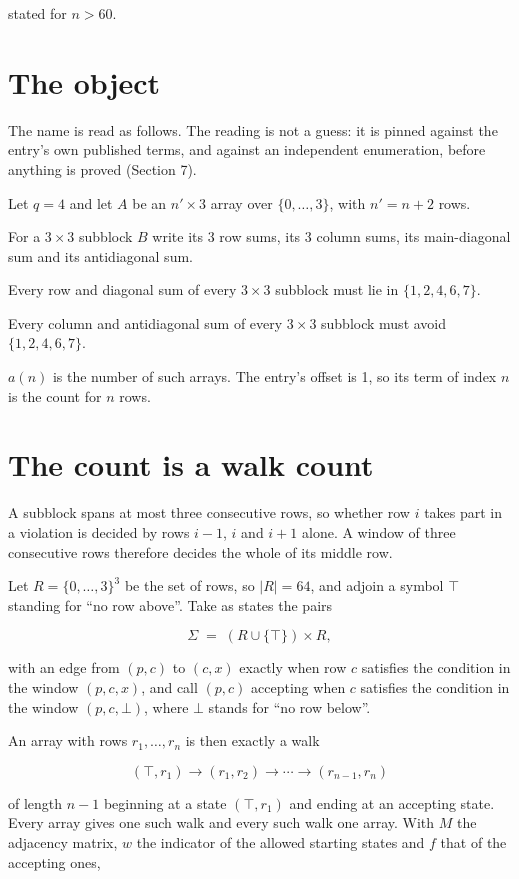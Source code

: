 \documentclass[11pt]{article}
\theoremstyle{definition}
\begin{document}
stated for $n > 60$.

\section{The object}

The name is read as follows. The reading is not a guess: it is pinned against the entry's own published terms, and against an independent enumeration, before anything is proved (Section 7).

Let $q = 4$ and let $A$ be an $n' \times 3$ array over $\{0,\dots,3\}$, with $n' = n + 2$ rows.

For a $3\times3$ subblock $B$ write its 3 row sums, its 3 column sums, its main-diagonal sum and its antidiagonal sum.

Every row and diagonal sum of every $3\times3$ subblock must lie in $\{1, 2, 4, 6, 7\}$.

Every column and antidiagonal sum of every $3\times3$ subblock must avoid $\{1, 2, 4, 6, 7\}$.

$a(n)$ is the number of such arrays. The entry's offset is 1, so its term of index $n$ is the count for $n$ rows.

\section{The count is a walk count}

A subblock spans at most three consecutive rows, so whether row $i$ takes part in a violation is decided by rows $i-1$, $i$ and $i+1$ alone. A window of three consecutive rows therefore decides the whole of its middle row.

Let $R = \{0,\dots,3\}^{3}$ be the set of rows, so $|R| = 64$, and adjoin a symbol $\top$ standing for ``no row above''. Take as states the pairs

\[\Sigma \;=\; (R \cup \{\top\}) \times R,\]

with an edge from $(p,c)$ to $(c,x)$ exactly when row $c$ satisfies the condition in the window $(p,c,x)$, and call $(p,c)$ accepting when $c$ satisfies the condition in the window $(p,c,\bot)$, where $\bot$ stands for ``no row below''.

An array with rows $r_1,\dots,r_n$ is then exactly a walk

\[(\top,r_1) \to (r_1,r_2) \to \cdots \to (r_{n-1},r_n)\]

of length $n-1$ beginning at a state $(\top,r_1)$ and ending at an accepting state. Every array gives one such walk and every such walk one array. With $M$ the adjacency matrix, $w$ the indicator of the allowed starting states and $f$ that of the accepting ones,
\end{document}
